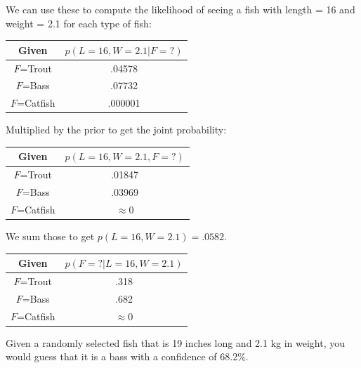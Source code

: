 We can use these to compute the likelihood of seeing a fish with length = 16 and weight = 2.1 for each type of fish:

\begin{tabular}{c | c }
Given & $p(L=16, W=2.1 | F=?)$ \\
\hline
$F$=Trout & .04578 \\
$F$=Bass &  .07732 \\
$F$=Catfish  & .000001 
\end{tabular}

Multiplied by the prior to get the joint probability:

\begin{tabular}{c | c }
Given & $p(L=16, W=2.1, F=?)$ \\
\hline
$F$=Trout & .01847 \\
$F$=Bass &  .03969 \\
$F$=Catfish  &  $\approx 0$
\end{tabular}

We sum those to get $p(L=16, W=2.1) = .0582$.

\begin{tabular}{c | c }
Given & $p(F=? | L=16, W=2.1)$ \\
\hline
$F$=Trout & .318 \\
$F$=Bass &  .682 \\
$F$=Catfish  &  $\approx 0$
\end{tabular}

Given a randomly selected fish that is 19 inches long and 2.1 kg in weight,  you would guess that it is a bass with a confidence of 68.2\%.


